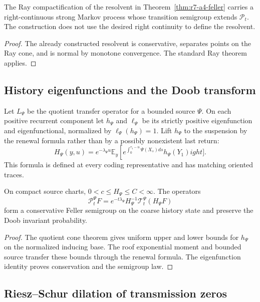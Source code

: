 \begin{corollary}
\label{cor:r7-a4-ray}
The Ray compactification of the resolvent in
Theorem~\ref{thm:r7-a4-feller} carries a right-continuous strong Markov process
whose transition semigroup extends $\mathcal P_t$.  The construction does not
use the desired right continuity to define the resolvent.
\end{corollary}

\begin{proof}
The already constructed resolvent is conservative, separates points on the Ray
cone, and is normal by monotone convergence.  The standard Ray theorem applies.
\end{proof}

\subsection{History eigenfunctions and the Doob transform}

Let $L_\Psi$ be the quotient transfer operator for a bounded source $\Psi$.
On each positive recurrent component let $h_\Psi$ and $\ell_\Psi$ be its
strictly positive eigenfunction and eigenfunctional, normalized by
$\ell_\Psi(h_\Psi)=1$.  Lift $h_\Psi$ to the suspension by the renewal formula
rather than by a possibly nonexistent last return:
\[
 H_\Psi(y,u)=e^{-\lambda_\Psi u}
 \mathbb E_y\left[
 e^{\int_0^{\tau_1-u}\Psi(X_s)ds}
 h_\Psi(Y_1)
ight].
\]
This formula is defined at every coding representative and has matching
oriented traces.

\begin{theorem}
\label{thm:r7-a4-doob}
On compact source charts,
$0<c\le H_\Psi\le C<\infty$.  The operators
\[
 \mathcal P_t^\Psi F
 =e^{-t\lambda_\Psi}H_\Psi^{-1}
 \mathcal T_t^\Psi(H_\Psi F)
\]
form a conservative Feller semigroup on the coarse history state and preserve
the Doob invariant probability.
\end{theorem}

\begin{proof}
The quotient cone theorem gives uniform upper and lower bounds for
$h_\Psi$ on the normalized inducing base.  The roof exponential moment and
bounded source transfer these bounds through the renewal formula.  The
eigenfunction identity proves conservation and the semigroup law.
\end{proof}

\subsection{Riesz--Schur dilation of transmission zeros}

